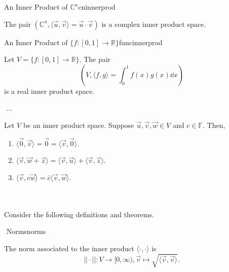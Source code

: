         \begin{example}{An Inner Product of \(\mathbb{C}^n\)}{cninnerprod}
            
            The pair \((\mathbb{C}^n, \langle \vec{u},\vec{v}\rangle=\vec{u}\cdot\vec{v})\) is a complex inner product space.

        \end{example}
        \begin{example}{An Inner Product of \(\{f:[0,1]\to\mathbb{R}\}\)}{funcinnerprod}

            Let \(V=\{f:[0,1]\to\mathbb{R}\}\). The pair
            \begin{equation*}
                \left(V,\langle f, g\rangle=\int_0^1 f(x)g(x)\dd x\right)
            \end{equation*}
            is a real inner product space.
            
        \end{example}
        \begin{theorem}{\Stop\,\,}{...}

            Let \(V\) be an inner product space. Suppose \(\vec{u},\vec{v},\vec{w}\in V\) and \(c\in\mathbb{F}\). Then,
            \begin{enumerate}
                \item \(\langle\vec{0},\vec{v}\rangle=\vec{0}=\langle\vec{v},\vec{0}\rangle\).
                \item \(\langle \vec{v},\vec{w}+\vec{z}\rangle=\langle \vec{v},\vec{u}\rangle+\langle\vec{v},\vec{z}\rangle\).
                \item \(\langle\vec{v},c\vec{w}\rangle=\bar{c}\langle\vec{v},\vec{w}\rangle\).
            \end{enumerate}
            
        \end{theorem}
        \vphantom
        \\
        \\
        Consider the following definitions and theorems.
        \begin{definition}{\Stop\,\,Norms}{norms}

            The norm associated to the inner product \(\langle\cdot,\cdot\rangle\) is
            \begin{equation*}
                ||\cdot||:V\to[0,\infty),\vec{v}\mapsto\sqrt{\langle\vec{v},\vec{v}\rangle}.
            \end{equation*}
            
        \end{definition}
